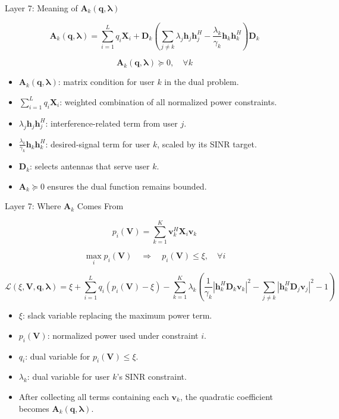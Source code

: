 \documentclass{beamer}
\begin{document}
\begin{frame}{Layer 7: Meaning of \(\mathbf{A}_k(\mathbf{q},\boldsymbol{\lambda})\)}
\scriptsize

\[
\mathbf{A}_k(\mathbf{q},\boldsymbol{\lambda})
=
\sum_{i=1}^{L}q_i\mathbf{X}_i
+
\mathbf{D}_k
\left(
\sum_{j\ne k}\lambda_j\mathbf{h}_j\mathbf{h}_j^H
-
\frac{\lambda_k}{\gamma_k}
\mathbf{h}_k\mathbf{h}_k^H
\right)
\mathbf{D}_k
\]

\[
\mathbf{A}_k(\mathbf{q},\boldsymbol{\lambda})\succeq0,
\quad \forall k
\]

\begin{itemize}
    \item \(\mathbf{A}_k(\mathbf{q},\boldsymbol{\lambda})\): matrix condition for user \(k\) in the dual problem.
    \item \(\sum_{i=1}^{L}q_i\mathbf{X}_i\): weighted combination of all normalized power constraints.
    \item \(\lambda_j\mathbf{h}_j\mathbf{h}_j^H\): interference-related term from user \(j\).
    \item \(\frac{\lambda_k}{\gamma_k}\mathbf{h}_k\mathbf{h}_k^H\): desired-signal term for user \(k\), scaled by its SINR target.
    \item \(\mathbf{D}_k\): selects antennas that serve user \(k\).
    \item \(\mathbf{A}_k\succeq0\) ensures the dual function remains bounded.
\end{itemize}

\end{frame}
\begin{frame}{Layer 7: Where \(\mathbf{A}_k\) Comes From}
\scriptsize

\[
p_i(\mathbf{V})
=
\sum_{k=1}^{K}
\mathbf{v}_k^H\mathbf{X}_i\mathbf{v}_k
\]

\[
\max_i p_i(\mathbf{V})
\quad \Longrightarrow \quad
p_i(\mathbf{V})\le \xi,\quad \forall i
\]

\[
\mathcal{L}(\xi,\mathbf{V},\mathbf{q},\boldsymbol{\lambda})
=
\xi
+
\sum_{i=1}^{L}q_i(p_i(\mathbf{V})-\xi)
-
\sum_{k=1}^{K}\lambda_k
\left(
\frac{1}{\gamma_k}
|\mathbf{h}_k^H\mathbf{D}_k\mathbf{v}_k|^2
-
\sum_{j\ne k}
|\mathbf{h}_k^H\mathbf{D}_j\mathbf{v}_j|^2
-
1
\right)
\]

\begin{itemize}
    \item \(\xi\): slack variable replacing the maximum power term.
    \item \(p_i(\mathbf{V})\): normalized power used under constraint \(i\).
    \item \(q_i\): dual variable for \(p_i(\mathbf{V})\le\xi\).
    \item \(\lambda_k\): dual variable for user \(k\)'s SINR constraint.
    \item After collecting all terms containing each \(\mathbf{v}_k\), the quadratic coefficient becomes \(\mathbf{A}_k(\mathbf{q},\boldsymbol{\lambda})\).
\end{itemize}

\end{frame}
\end{document}
